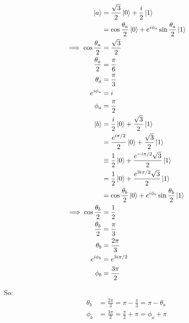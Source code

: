\documentclass[12pt]{extarticle}
\begin{document}
\begin{align*}
\ket{a} & = \frac{\sqrt{3}}{2}\ket{0} + \frac{i}{2}\ket{1} \\
& = \cos{\frac{\theta_a}{2}}\ket{0} + e^{i\phi_a}\sin{\frac{\theta_a}{2}}\ket{1} \\
\implies \cos{\frac{\theta_a}{2}} & = \frac{\sqrt{3}}{2} \\
\frac{\theta_a}{2} & = \frac{\pi}{6} \\
\theta_a & = \frac{\pi}{3} \\
e^{i\phi_a} & = i \\
\phi_a & = \frac{\pi}{2} \\
\ket{b} & = \frac{i}{2}\ket{0} + \frac{\sqrt{3}}{2}\ket{1} \\
& = \frac{e^{i\pi/2}}{2}\ket{0} + \frac{\sqrt{3}}{2}\ket{1} \\
& \equiv \frac{1}{2}\ket{0} + \frac{e^{-i\pi/2}\sqrt{3}}{2}\ket{1} \\
& = \frac{1}{2}\ket{0} + \frac{e^{3i\pi/2}\sqrt{3}}{2}\ket{1} \\
& = \cos{\frac{\theta_b}{2}}\ket{0} + e^{i\phi_b}\sin{\frac{\theta_b}{2}}\ket{1} \\
\implies \cos{\frac{\theta_b}{2}} & = \frac{1}{2} \\
\frac{\theta_b}{2} & = \frac{\pi}{3} \\
\theta_b & = \frac{2\pi}{3} \\
e^{i\phi_b} & = e^{3i\pi/2} \\
\phi_b & = \frac{3\pi}{2} \\
\end{align*}

So:
\begin{align*}
\theta_b & = \frac{2\pi}{3} = \pi - \frac{\pi}{3} = \pi - \theta_a \\
\phi_b & = \frac{3\pi}{2} = \frac{\pi}{2} + \pi = \phi_a + \pi
\end{align*}


\printbibliography
\end{document}
